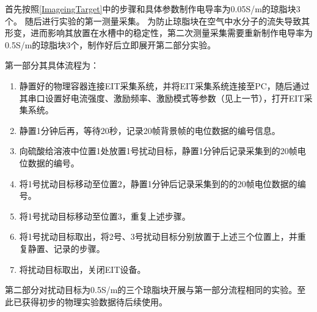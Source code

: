 首先按照\cref{ImageingTarget}中的步骤和具体参数制作电导率为0.05S/m的琼脂块3个。
随后进行实验的第一测量采集。
为防止琼脂块在空气中水分子的流失导致其形变，进而影响其放置在水槽中的稳定性，第二次测量采集需要重新制作电导率为0.5S/m的琼脂块3个，制作好后立即展开第二部分实验。

第一部分其具体流程为：
\begin{enumerate}
    \item 静置好的物理容器连接EIT采集系统，并将EIT采集系统连接至PC，随后通过其串口设置好电流强度、激励频率、激励模式等参数（见上一节），打开EIT采集系统。
    \item 静置1分钟后再，等待20秒，记录20帧背景帧的电位数据的编号信息。
    \item 向硫酸给溶液中位置1处放置1号扰动目标，静置1分钟后记录采集到的20帧电位数据的编号。
    \item 将1号扰动目标移动至位置2，静置1分钟后记录采集到的的20帧电位数据的编号。
    \item 将1号扰动目标移动至位置3，重复上述步骤。
    \item 将1号扰动目标取出，将2号、3号扰动目标分别放置于上述三个位置上，并重复静置、记录的步骤。
    \item 将扰动目标取出，关闭EIT设备。
\end{enumerate}

第二部分对扰动目标为0.5S/m的三个琼脂块开展与第一部分流程相同的实验。至此已获得初步的物理实验数据待后续使用。

